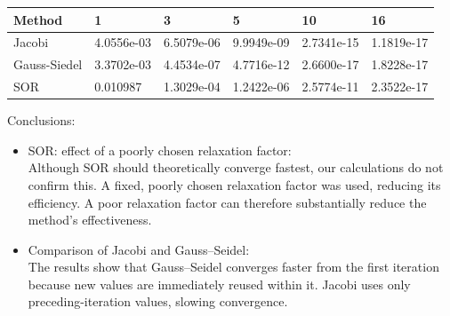 \documentclass[a4paper, 11pt]{article}
\begin{document}
\begin{center}
\begin{tabular}{|l|l|l|l|l|l|}
\hline
Method       & 1          & 3          & 5          & 10         & 16         \\ \hline
Jacobi       & 4.0556e-03 & 6.5079e-06 & 9.9949e-09 & 2.7341e-15 & 1.1819e-17 \\ \hline
Gauss-Siedel & 3.3702e-03 & 4.4534e-07 & 4.7716e-12 & 2.6600e-17 & 1.8228e-17 \\ \hline
SOR          & 0.010987   & 1.3029e-04 & 1.2422e-06 & 2.5774e-11 & 2.3522e-17 \\ \hline
\end{tabular}
\end{center}
Conclusions:
\begin{itemize}
    \item SOR: effect of a poorly chosen relaxation factor:\\
    Although SOR should theoretically converge fastest, our calculations do not confirm this. A fixed, poorly chosen relaxation factor was used, reducing its efficiency. A poor relaxation factor can therefore substantially reduce the method's effectiveness.
    \item Comparison of Jacobi and Gauss--Seidel:\\
    The results show that Gauss--Seidel converges faster from the first iteration because new values are immediately reused within it. Jacobi uses only preceding-iteration values, slowing convergence.
\end{itemize}
\end{document}
